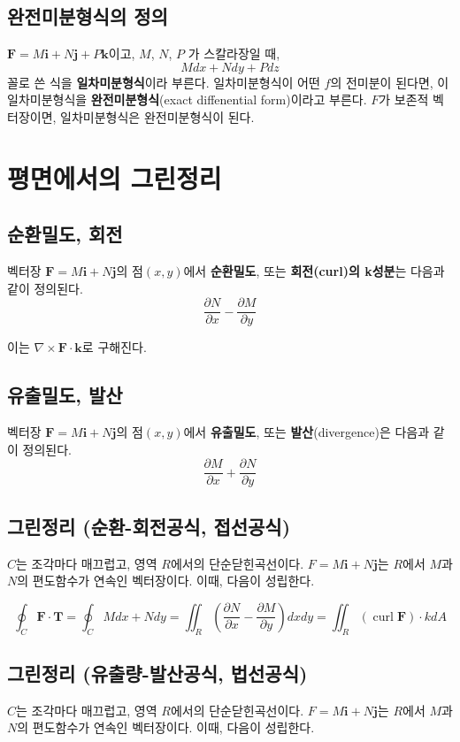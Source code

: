 \documentclass[chapter, oneside]{oblivoir}
\newcommand{\term}[1]{\textbf{#1}}
\begin{document}
\subsection{완전미분형식의 정의}
$\textbf{F}=M\textbf{i}+N\textbf{j}+P\textbf{k}$이고, $M$, $N$, $P$ 가 스칼라장일 때, 
$$ M dx + N dy + P dz$$
꼴로 쓴 식을 \term{일차미분형식}이라 부른다. 
일차미분형식이 어떤 $f$의 전미분이 된다면, 이 일차미분형식을 \term{완전미분형식}(exact diffenential form)이라고 부른다.
 $F$가 보존적 벡터장이면, 일차미분형식은 완전미분형식이 된다.


\section{평면에서의 그린정리}
\subsection{순환밀도, 회전 }
벡터장 $\textbf{F}=M\textbf{i}+N\textbf{j}$의 점$(x,y)$에서 \term{순환밀도}, 또는 \term{회전(curl)의 k성분}는 다음과 같이 정의된다.
$$\frac{\partial N}{\partial x} - \frac{\partial M}{\partial y} $$

이는 $\nabla \times \textbf{F} \cdot \textbf{k}$로 구해진다.

\subsection{유출밀도, 발산}
벡터장 $\textbf{F}=M\textbf{i}+N\textbf{j}$의 점$(x,y)$에서 \term{유출밀도}, 또는 \term{발산}(divergence)은 다음과 같이 정의된다.
$$ \frac{\partial M}{\partial x} + \frac{\partial N}{\partial y}$$

\subsection{그린정리 (순환-회전공식, 접선공식)}
$C$는 조각마다 매끄럽고, 영역 $R$에서의 단순닫힌곡선이다.
$F=M\textbf{i}+N\textbf{j}$는 $R$에서  $M$과 $N$의 편도함수가 연속인 벡터장이다.
이때, 다음이 성립한다.

$$ 
\oint_C \textbf{F} \cdot \textbf{T} 
= \oint_C M dx + N dy = \iint_R \left( \frac{\partial N}{\partial x} - \frac{\partial M}{\partial y} \right) dx dy 
= \iint_R \left( \operatorname{curl} \textbf{F} \right)\cdot k dA $$

\subsection{그린정리 (유출량-발산공식, 법선공식)}
$C$는 조각마다 매끄럽고, 영역 $R$에서의 단순닫힌곡선이다.
$F=M\textbf{i}+N\textbf{j}$는 $R$에서  $M$과 $N$의 편도함수가 연속인 벡터장이다.
이때, 다음이 성립한다.
\end{document}
